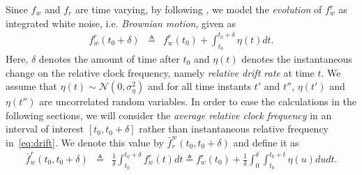 \documentclass[journal,draftcls,onecolumn,12pt,twoside]{IEEEtranTCOM}
\begin{document}
Since $f_w$ and $f_r$ are time varying, by following 
\cite{Zhong:2011:On-demand,Huang:2013:PSR}, we model the 
\emph{evolution} 
of $f_w^r$ as 
integrated white noise, i.e. \emph{Brownian motion}, given as
\begin{eqnarray}
f_{w}^{r}(t_{0}+\delta) & \triangleq & 
f_{w}^{r}(t_{0})+\int_{t_{0}}^{t_{0}+\delta}\eta(t)dt.\label{eq:drift}
\end{eqnarray}
Here, $\delta$ denotes the amount of time after $t_0$ and $\eta(t)$ denotes 
the instantaneous change on the relative clock frequency, namely 
\emph{relative drift rate} at time $t$. We assume that 
$\eta(t)\sim\mathcal{N}(0,\sigma_{\eta}^{2})$ and for all 
time instants $t'$ and $t''$, $\eta(t')$ and $\eta(t'')$ are uncorrelated 
random variables. In order to ease the calculations in the following sections, 
we will consider the \emph{average relative clock frequency} in an interval of 
interest $[t_0,t_0+\delta]$ rather than instantaneous relative frequency 
in~\eqref{eq:drift}. We denote this value by $\bar{f}_{r}^{w}(t_0,t_0+\delta)$ 
and define it as 
\begin{eqnarray}
\bar{f}_{w}^{r}(t_0,t_0+\delta) & \triangleq & 
\frac{1}{\delta}\int_{t_0}^{t_0+\delta} 
f_w^r(t)dt \triangleq
f_{w}^{r}(t_{0})+\frac{1}{\delta}\int_{0}^{\delta}\int_{t_{0}}^{t_{0}+t}\eta(u)dudt.
\label{eq:drift_relation}
\end{eqnarray}
\end{document}
